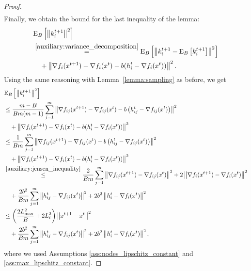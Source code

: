 \documentclass{article}
\begin{document}
\begin{proof}
\begin{align*}
  \end{align*}
  Finally, we obtain the bound for the last inequality of the lemma:
  \begin{align*}
    &{\rm E}_{B}\left[\left\| k^{t+1}_i \right\|^2\right]\\
    &\overset{\eqref{auxiliary:variance_decomposition}}{=}{\rm E}_{B}\left[\left\| k^{t+1}_i - {\rm E}_{B}\left[k^{t+1}_i\right] \right\|^2\right]\\
    &\quad + \left\| \nabla f_i(x^{t+1}) - \nabla f_i(x^{t}) - b(h^t_i - \nabla f_i(x^{t})) \right\|^2.
  \end{align*}
  Using the same reasoning with Lemma~\ref{lemma:sampling} as before, we get
  \begin{align*}
    &{\rm E}_{B}\left[\left\| k^{t+1}_i \right\|^2\right]\\
    &\leq\frac{m - B}{B m (m - 1)}\sum_{j=1}^m\left\| \nabla f_{ij}(x^{t+1}) - \nabla f_{ij}(x^{t}) - b \left(h^t_{ij} - \nabla f_{ij}(x^{t})\right) \right\|^2\\
    &\quad + \left\| \nabla f_i(x^{t+1}) - \nabla f_i(x^{t}) - b(h^t_i - \nabla f_i(x^{t})) \right\|^2 \\
    &\leq\frac{1}{B m}\sum_{j=1}^m\left\| \nabla f_{ij}(x^{t+1}) - \nabla f_{ij}(x^{t}) - b \left(h^t_{ij} - \nabla f_{ij}(x^{t})\right) \right\|^2\\
    &\quad + \left\| \nabla f_i(x^{t+1}) - \nabla f_i(x^{t}) - b(h^t_i - \nabla f_i(x^{t})) \right\|^2 \\
    &\overset{\eqref{auxiliary:jensen_inequality}}{\leq}\frac{2}{B m}\sum_{j=1}^m\left\| \nabla f_{ij}(x^{t+1}) - \nabla f_{ij}(x^{t}) \right\|^2 + 2 \left\| \nabla f_i(x^{t+1}) - \nabla f_i(x^{t}) \right\|^2\\
    &\quad + \frac{2 b^2}{B m}\sum_{j=1}^m\left\| h^t_{ij} - \nabla f_{ij}(x^{t}) \right\|^2 + 2 b^2 \left\| h^t_i - \nabla f_i(x^{t}) \right\|^2 \\
    &\leq\left(\frac{2 L_{\max}^2}{B} + 2 L_i^2\right)\left\| x^{t+1} - x^{t} \right\|^2 \\
    &\quad + \frac{2 b^2}{B m}\sum_{j=1}^m\left\| h^t_{ij} - \nabla f_{ij}(x^{t}) \right\|^2 + 2 b^2 \left\| h^t_i - \nabla f_i(x^{t}) \right\|^2,
  \end{align*}
  where we used Assumptions \ref{ass:nodes_lipschitz_constant} and \ref{ass:max_lipschitz_constant}.
\end{proof}

\CONVERGENCEFINITEMVR*
\end{document}
